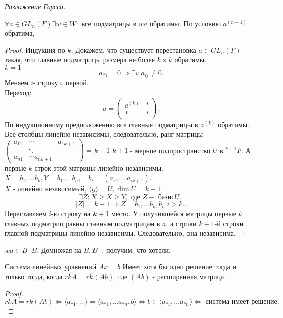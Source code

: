 \documentclass[12pt]{report}
\begin{document}
\begin{proof}[Разложение Гаусса]
    \begin{lm}
	$\forall a \in  GL_n(F) \exists w \in  W : $ все подматрицы в $wa$ обратимы.
	По условию $a^{(n-1)}$ обратима, 
    \end{lm}
    \begin{proof}
	Индукция по $k$.
	Докажем, что существует перестановка $a \in  GL_n(F)$ такая, что главные подматрицы размера не более $k \times k$ обратимы.
	\\
	$k=1$ \[
	    a_{*1} = 0 \Rightarrow \exists i: a_{ij} \ne 0
	.\] Меняем $i$- строку с первой.
	\\
	Переход:
	\[
	a = 
	\left ( 
	\begin{array}{cc}
	    a^{(k)}& *\\
	    * & *
	\end{array}
	\right )
	.\] 
	По индукционному предположению все главные подматрицы в $a^{(k)}$ обратимы.
	Все столбцы линейно независимы, следовательно, ранг матрицы $
	\left ( 
	\begin{array}{ccc}
	    a_{11} &\cdots&a_{1 k+1} \\
		   &\ddots&\\
	    a_{n 1}& \cdots a_{n k+1}
	\end{array}
	\right ) = k+1$
	$k+1$ - мерное подпространство $U$  в $^{k+1} F$. А первые $k$ строк этой матрицы линейно независимы. 
	$X = {b_1, \ldots b_k}, Y={b_1, \ldots b_n}, \quad b_i = (a_{i 1} , \ldots a_{i k+1})$. \\
	$X$ - линейно независимый, $\langle y \rangle = U, \dim U = k+1$.\\
	\[
	\exists Z : X \ge X \ge Y, \mbox{ где }Z - \mbox{ базис} U.
	.\] 
	\[
	    |Z| = k+1 \Rightarrow Z = {b_1, \ldots b_k, b_i}, i>k.
	.\] 
	Переставляем $ i$-ю строку на $k+1$ место. У получившейся матрицы первые $k$ главных подматриц равны главным подматрицам в $a$, а строки $k+1$-й строки главной подматрицы линейно независимы. Следовательно, она независима.
    \end{proof}
    $wa \in  B^- B$. Домножая на $B, B^-$, получим, что хотели.
\end{proof}
\begin{thm}
    Система линейных уравнений $Ax = b$ Имеет хотя бы одно решение тогда и только тогда, когда $rk A = rk (A b)$, где $(A b)$ - расширенная матрица.
\end{thm}
\begin{proof}
    \[
	rk A = rk(A b) \Leftrightarrow \langle a_{*1}, \ldots \rangle = \langle a_{*1} , \ldots a_{*n}, b \rangle \Leftrightarrow b \in  \langle a_{*1}, \ldots a_{*n} \rangle \Leftrightarrow \mbox{ система имеет решение}
    .\] 
\end{proof}
\end{document}
